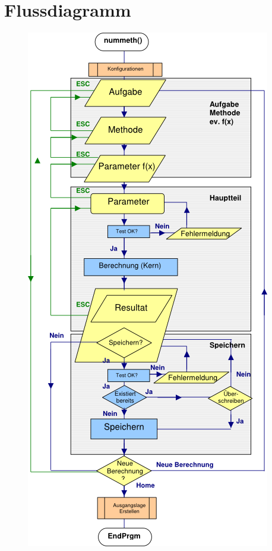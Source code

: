\documentclass[a5paper,9pt]{scrreprt}
\begin{document}
\listoffigures



\appendix
\chapter{Flussdiagramm}
\label{sec:Flowchart}
\begin{figure}[h]
  \centering
  \includegraphics[height=0.74\textheight]{img/nummeth_flowchart.png}
\end{figure}

% 
%  
\end{document}
